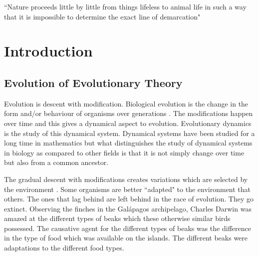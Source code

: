 \documentclass[oneside,11pt,a4paper]{book}
\begin{document}

\begin{savequote}[15pc]
\sffamily
``Nature proceeds little by little from things lifeless to animal life in such a way that it is impossible to determine the exact line of demarcation"\\
\end{savequote}


\chapter{Introduction}
\label{chap:intro}

\graphicspath{{Chapter1figs/}{Chapter1figs/}{Chapter1figs/}}

\section{Evolution of Evolutionary Theory}
\label{sec:hist}

Evolution is descent with modification.
Biological evolution is the change in the form and/or behaviour of organisms over generations \citep{ridley:1996bo}.
The modifications happen over time and this gives a dynamical aspect to evolution.
Evolutionary dynamics is the study of this dynamical system.
Dynamical systems have been studied for a long time in mathematics but what 
distinguishes the study of dynamical systems in biology as compared to other fields is that
it is not simply change over time but also from a common ancestor.

The gradual descent with modifications creates variations which are selected by the environment  \citep{ridley:1996bo}.
Some organisms are better ``adapted" to the environment that others.
The ones that lag behind are left behind in the race of evolution.
They go extinct.
Observing the finches in the Gal\'apagos archipelago, Charles Darwin was amazed at the different types of beaks which these otherwise similar birds possessed.
The causative agent for the different types of beaks was the difference in the type of food which was available on the islands.
The different beaks were adaptations to the different food types.
\end{document}
